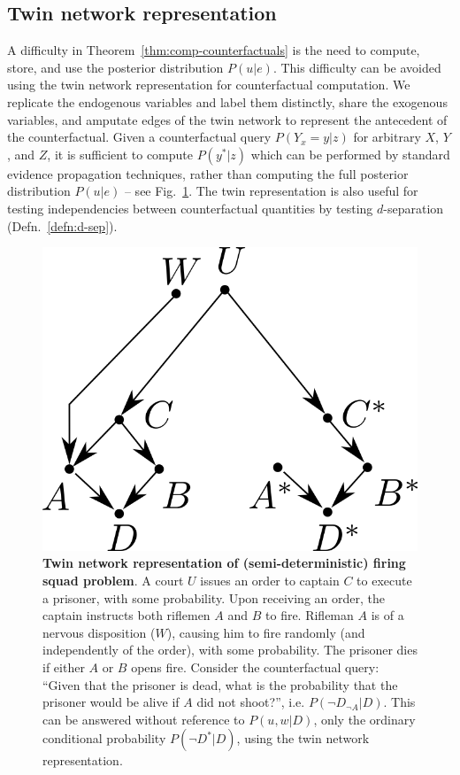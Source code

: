 \documentclass[11pt]{article}
\numberwithin{equation}{section}
\begin{document}
\subsection{Twin network representation}
A difficulty in Theorem~\ref{thm:comp-counterfactuals} is the need to compute, store, and use the posterior distribution $P(u|e)$. This difficulty can be avoided using the twin network representation for counterfactual computation. We replicate the endogenous variables and label them distinctly, share the exogenous variables, and amputate edges of the twin network to represent the antecedent of the counterfactual. Given a counterfactual query $P(Y_x=y|z)$ for arbitrary $X$, $Y$, and $Z$, it is sufficient to compute $P(y^*|z)$ which can be performed by standard evidence propagation techniques, rather than computing the full posterior distribution $P(u|e)$ -- see Fig.~\ref{Fig:twin-network}. The twin representation is also useful for testing independencies between counterfactual quantities by testing $d$-separation (Defn.~\ref{defn:d-sep}).

\begin{figure}
\begin{center}
\includegraphics[width=0.4\columnwidth]{figures/twin-network.png}  
\end{center}
\caption{\textbf{Twin network representation of (semi-deterministic) firing squad problem}. A court $U$ issues an order to captain $C$ to execute a prisoner, with some probability. Upon receiving an order, the captain instructs both riflemen $A$ and $B$ to fire. Rifleman $A$ is of a nervous disposition ($W$), causing him to fire randomly (and independently of the order), with some probability. The prisoner dies if either $A$ or $B$ opens fire. Consider the counterfactual query: ``Given that the prisoner is dead, what is the probability that the prisoner would be alive if $A$ did not shoot?'', i.e. $P(\neg D_{\neg A}| D)$. This can be answered without reference to $P(u,w|D)$, only the ordinary conditional probability $P(\neg D^*|D)$, using the twin network representation. }
\label{Fig:twin-network}
\end{figure}
\end{document}
